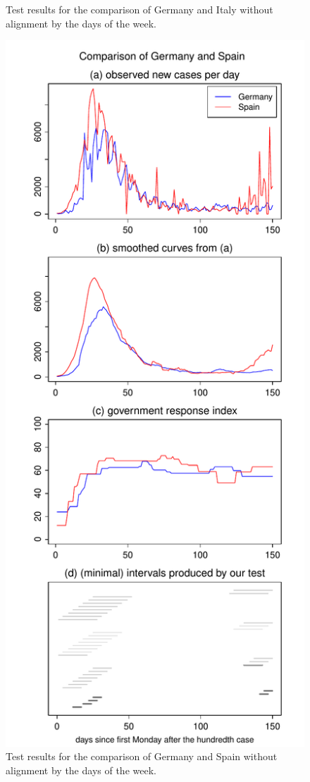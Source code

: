 \documentclass[a4paper,12pt]{article}
\numberwithin{equation}{section}
\begin{document}
{\begin{figure}[h!]
\begin{minipage}[t]{0.49\textwidth}
\caption{Test results for the comparison of Germany and Italy without alignment by the days of the week.}
\end{minipage}
\hspace{0.25cm}
\begin{minipage}[t]{0.49\textwidth}
\includegraphics[width=\textwidth]{plots/DEU_vs_ESP_wa}
\caption{Test results for the comparison of Germany and Spain without alignment by the days of the week.}
\end{minipage}
\end{figure}

}
\end{document}
